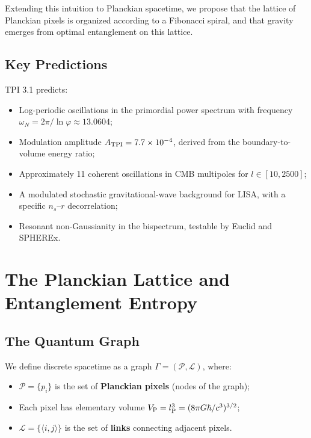 \documentclass[11pt,a4paper]{article}
\theoremstyle{definition}
\begin{document}
Extending this intuition to Planckian spacetime, we propose that the lattice of Planckian pixels is organized according to a Fibonacci spiral, and that gravity emerges from optimal entanglement on this lattice.

\subsection{Key Predictions}

TPI 3.1 predicts:
\begin{itemize}
    \item Log-periodic oscillations in the primordial power spectrum with frequency $\omega_N = 2\pi/\ln\varphi \approx 13.0604$;
    \item Modulation amplitude $A_{\rm TPI} = 7.7\times 10^{-4}$, derived from the boundary-to-volume energy ratio;
    \item Approximately 11 coherent oscillations in CMB multipoles for $l \in [10, 2500]$;
    \item A modulated stochastic gravitational-wave background for LISA, with a specific $n_s$--$r$ decorrelation;
    \item Resonant non-Gaussianity in the bispectrum, testable by Euclid and SPHEREx.
\end{itemize}

\section{The Planckian Lattice and Entanglement Entropy}\label{sec:lattice}

\subsection{The Quantum Graph}

We define discrete spacetime as a graph $\Gamma = (\mathcal{P}, \mathcal{L})$, where:
\begin{itemize}
    \item $\mathcal{P} = \{p_i\}$ is the set of \textbf{Planckian pixels} (nodes of the graph);
    \item Each pixel has elementary volume $V_{\rm P} = l_{\rm P}^3 = (8\pi G\hbar/c^3)^{3/2}$;
    \item $\mathcal{L} = \{\langle i,j \rangle\}$ is the set of \textbf{links} connecting adjacent pixels.
\end{itemize}
\end{document}
